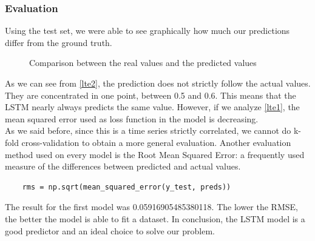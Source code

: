 \subsubsection{Evaluation}
Using the test set, we were able to see graphically how much our predictions differ from the ground truth. 
\begin{figure}[H]
    \centering
    
    \caption{Comparison between the real values and the predicted values}
    \label{lte2}
\end{figure}
As we can see from \autoref{lte2}, the prediction does not strictly follow the actual values. They are concentrated in one point, between 0.5 and 0.6. This means that the LSTM nearly always predicts the same value. However, if we analyze \autoref{lte1}, the mean squared error used as loss function in the model is decreasing. \\
As we said before, since this is a time series strictly correlated, we cannot do k-fold cross-validation to obtain a more general evaluation. Another evaluation method used on every model is the Root Mean Squared Error: a frequently used measure of the differences between predicted and actual values.
\begin{verbatim}
    rms = np.sqrt(mean_squared_error(y_test, preds))
\end{verbatim}
The result for the first model was 0.05916905485380118. The lower the RMSE, the better the model is able to fit a dataset. In conclusion, the LSTM model is a good predictor and an ideal choice to solve our problem.
